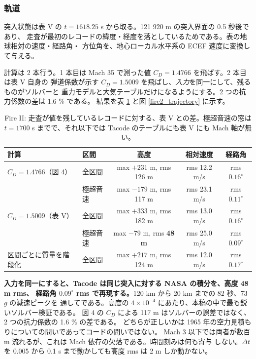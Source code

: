 \documentclass[11pt,a4paper,dvipdfmx]{jsarticle}
\begin{document}
\subsubsection{軌道}

突入状態は表 V の $t = 1618.25$ s から取る。121 920 m の突入界面の 0.5 秒後であり、
走査が最初のレコードの緯度・経度を落としているためである。表の地球相対の速度・経路角・
方位角を、地心ローカル水平系の ECEF 速度に変換して与える。

計算は 2 本行う。1 本目は Mach 35 で測った値 $C_D = 1.4766$ を飛ばす。2 本目は表 V 自身の
弾道係数が示す $C_D = 1.5009$ を飛ばし、\emph{入力}を同一にして、残るものがソルバーと
重力モデルと大気テーブルだけになるようにする。2 つの抗力係数の差は 1.6 \% である。
結果を表 \ref{fire2_trajectory_results} と図 \ref{fire2_trajectory} に示す。

\begin{table}[h]
\caption{Fire II: 走査が値を残しているレコードに対する、表 V との差。極超音速の窓は
$t = 1700$ s までで、それ以下では Tacode のテーブルにも表 V にも Mach 軸が無い。}
\label{fire2_trajectory_results}
\begin{center}
\footnotesize
\begin{tabular}{l|l|c|c|c}
\hline \hline
計算 & 区間 & 高度 & 相対速度 & 経路角 \\
\hline
$C_D = 1.4766$（図 4） & 全区間 & max $+231$ m, rms 126 m & rms 12.2 m/s & rms $0.16^\circ$ \\
                       & 極超音速 & max $-179$ m, rms 117 m & rms 23.1 m/s & rms $0.11^\circ$ \\
$C_D = 1.5009$（表 V） & 全区間 & max $+333$ m, rms 182 m & rms 13.0 m/s & rms $0.16^\circ$ \\
                       & 極超音速 & max $-79$ m, rms \textbf{48 m} & rms 25.0 m/s & rms \textbf{$0.09^\circ$} \\
区間ごとに質量を階段化 & 全区間 & max $+217$ m, rms 124 m & rms 12.0 m/s & rms $0.17^\circ$ \\
\hline \hline
\end{tabular}
\end{center}
\end{table}

\textbf{入力を同一にすると、Tacode は同じ突入に対する NASA の積分を、高度 48 m rms、
経路角 $0.09^\circ$ rms で再現する。}120 km から 20 km までの 82 秒、73 $g$ の減速ピークを
通してである。高度の $4 \times 10^{-4}$ にあたり、本稿の中で最も鋭いソルバー検証である。
図 4 の $C_D$ による 117 m はソルバーの誤差ではなく、2 つの抗力係数の 1.6 \% の差である。
どちらが正しいかは 1965 年の空力見積もりについての問いであってコードの問いではない。
Mach 3 以下では両者が数百 m 流れるが、これは Mach 依存の欠落である。時間刻みは何も寄与
しない。$\Delta t$ を 0.005 から 0.1 s まで動かしても高度 rms は 2 m しか動かない。
\end{document}

